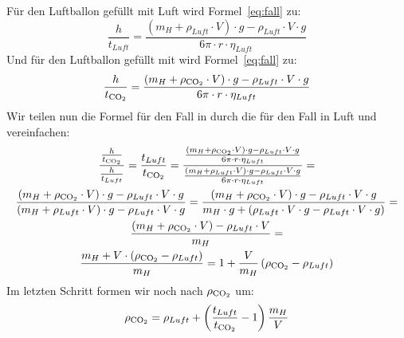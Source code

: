 \documentclass{article}
\begin{document}
      Für den Luftballon gefüllt mit Luft wird Formel~\ref{eq:fall} zu:
      \begin{equation} \label{eq:fall_luft}
          \frac{h}{t_{Luft}} = \frac{ \left( m_H + \rho_{Luft} \cdot V \right) \cdot g - \rho_{Luft} \cdot V \cdot g }{ 6 \pi \cdot r \cdot \eta_{Luft} }
      \end{equation}
      Und für den Luftballon gefüllt mit  wird Formel~\ref{eq:fall} zu:
      \begin{equation} \label{eq:fall_co2}
          \frac{h}{t_{\ce{CO2}}} = \frac{ \left( m_H + \rho_{\ce{CO2}} \cdot V \right) \cdot g - \rho_{Luft} \cdot V \cdot g }{ 6 \pi \cdot r \cdot \eta_{Luft} }
      \end{equation}
      Wir teilen nun die Formel für den Fall in  durch die für den Fall in Luft und vereinfachen:
      \begin{equation} \label{eq:calc_rho_faktor}
          \begin{gathered}
              \frac{ \frac{h}{t_{\ce{CO2}}} }{ \frac{h}{t_{Luft}} } = \frac{ t_{Luft} }{ t_{\ce{CO2}} } =
              \frac{ \frac{ \left( m_H + \rho_{\ce{CO2}} \cdot V \right) \cdot g - \rho_{Luft} \cdot V \cdot g }{ 6 \pi \cdot r \cdot \eta_{Luft} } }
              { \frac{ \left( m_H + \rho_{Luft} \cdot V \right) \cdot g - \rho_{Luft} \cdot V \cdot g }{ 6 \pi \cdot r \cdot \eta_{Luft} } } = \\
              \frac{ \left( m_H + \rho_{\ce{CO2}} \cdot V \right) \cdot g - \rho_{Luft} \cdot V \cdot g }{ \left( m_H + \rho_{Luft} \cdot V \right) \cdot g - \rho_{Luft} \cdot V \cdot g } =
              \frac{ \left( m_H + \rho_{\ce{CO2}} \cdot V \right) \cdot g - \rho_{Luft} \cdot V \cdot g }{ m_H \cdot g + \left( \rho_{Luft} \cdot V \cdot g - \rho_{Luft} \cdot V \cdot g \right) } = \\
              \frac{ \left( m_H + \rho_{\ce{CO2}} \cdot V \right) - \rho_{Luft} \cdot V }{ m_H } = \\
              \frac{ m_H + V \cdot \left( \rho_{\ce{CO2}} - \rho_{Luft} \right)}{ m_H } = 1 + \frac{V}{m_H} \left( \rho_{\ce{CO2}} - \rho_{Luft} \right)
          \end{gathered}
      \end{equation}
      Im letzten Schritt formen wir noch nach \(\rho_{\ce{CO2}}\) um:
      \begin{equation} \label{eq:calc_rho_co2}
          \rho_{\ce{CO2}} = \rho_{Luft} + \left( \frac{t_{Luft}}{t_{\ce{CO2}}} - 1 \right) \frac{m_H}{V}
      \end{equation}
\end{document}
